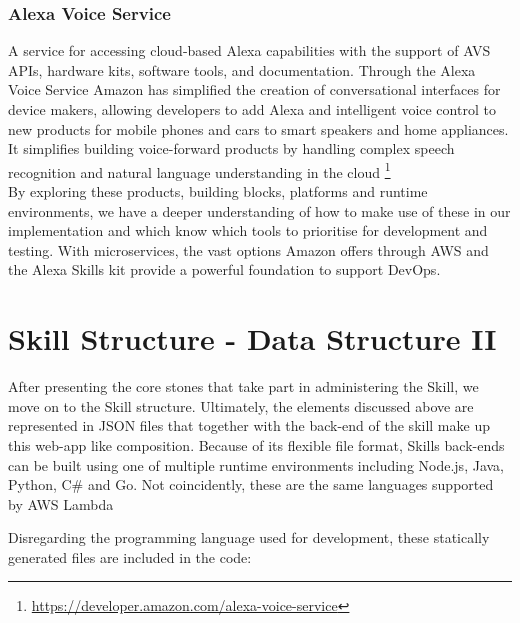 		
		\subsubsection*{Alexa Voice Service} %
		 A service for accessing cloud-based Alexa capabilities with the support of AVS APIs, hardware kits, software tools, and documentation. Through the Alexa Voice Service Amazon has simplified the creation of conversational interfaces for device makers, allowing developers to add Alexa and intelligent voice control to new products for mobile phones and cars to smart speakers and home appliances.
		 It simplifies building voice-forward products by handling complex speech recognition and natural language understanding in the cloud \footnote{\url{https://developer.amazon.com/alexa-voice-service}}\\



By exploring these products, building blocks, platforms and runtime environments, we have a deeper understanding of how to make use of these in our implementation and which know which tools to prioritise for development and testing. With microservices, the vast options Amazon offers through AWS and the Alexa Skills kit provide a powerful foundation to support DevOps.
	


\section[Data Structure II]{Skill Structure - Data Structure II}


After presenting the core stones that take part in administering the Skill, we move on to the Skill structure. Ultimately, the elements discussed above are represented in JSON files that together with the back-end of the skill make up this web-app like composition. Because of its flexible file format, Skills back-ends can be built using one of multiple runtime environments including Node.js, Java, Python, C\# and Go. 
Not coincidently, these are the same languages supported by AWS Lambda %

Disregarding the programming language used for development, these statically generated files are included in the code:


